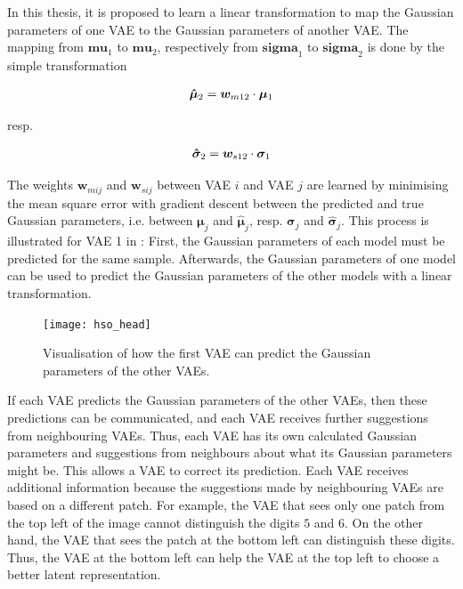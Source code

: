 In this thesis, it is proposed to learn a linear transformation to map the Gaussian parameters of one VAE to the Gaussian parameters of another VAE. The mapping from $\boldsymbol{mu}_1$ to $\boldsymbol{mu}_2$, respectively from $\boldsymbol{sigma}_1$ to $\boldsymbol{sigma}_2$ is done by the simple transformation

\begin{align}\eqlbl{hso_7}
	\boldsymbol{\hat{\mu}}_2 = \boldsymbol{w}_{m12} \cdot \boldsymbol{\mu}_1
\end{align}

resp.

\begin{align}\eqlbl{hso_8}
	\boldsymbol{\hat{\sigma}}_2 = \boldsymbol{w}_{s12} \cdot \boldsymbol{\sigma}_1
\end{align}

The weights $\boldsymbol{w}_{mij}$ and $\boldsymbol{w}_{sij}$ between VAE $i$ and VAE $j$ are learned by minimising the mean square error with gradient descent between the predicted and true Gaussian parameters, i.e. between $\boldsymbol{\mu}_j$ and $\boldsymbol{\hat{\mu}}_j$, resp. $\boldsymbol{\sigma}_j$ and $\boldsymbol{\hat{\sigma}}_j$. This process is illustrated for VAE 1 in : First, the Gaussian parameters of each model must be predicted for the same sample. Afterwards, the Gaussian parameters of one model can be used to predict the Gaussian parameters of the other models with a linear transformation.

\begin{figure}[h]
    \centering
    \texttt{[image: hso\_head]}
    \caption[Prediction of Gaussian parameters of other VAEs]{Visualisation of how the first VAE can predict the Gaussian parameters of the other VAEs.}
\end{figure}

If each VAE predicts the Gaussian parameters of the other VAEs, then these predictions can be communicated, and each VAE receives further suggestions from neighbouring VAEs. Thus, each VAE has its own calculated Gaussian parameters and suggestions from neighbours about what its Gaussian parameters might be. This allows a VAE to correct its prediction. Each VAE receives additional information because the suggestions made by neighbouring VAEs are based on a different patch. For example, the VAE that sees only one patch from the top left of the image cannot distinguish the digits $5$ and $6$. On the other hand, the VAE that sees the patch at the bottom left can distinguish these digits. Thus, the VAE at the bottom left can help the VAE at the top left to choose a better latent representation.

